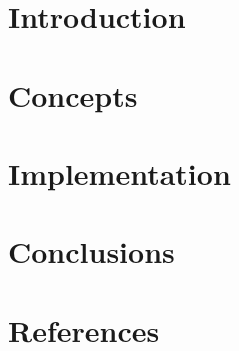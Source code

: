 \section[Intro]{Introduction}



\section[Con]{Concepts}



\section[Impl]{Implementation}



\section[End]{Conclusions}


\section[Refs]{References}
